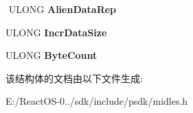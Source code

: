 \begin{DoxyCompactItemize}
$$\mbox{\label{struct___m_i_d_l___e_s___m_e_s_s_a_g_e_a3aa111c44fd601605aa2d4ae7d4327ff}} 
U\+L\+O\+NG {\bfseries Alien\+Data\+Rep}
\item 
\mbox{\label{struct___m_i_d_l___e_s___m_e_s_s_a_g_e_a15d4182df8fd4a4e8bf1bf74dc11bc67}} 
U\+L\+O\+NG {\bfseries Incr\+Data\+Size}
\item 
\mbox{\label{struct___m_i_d_l___e_s___m_e_s_s_a_g_e_a236808812d2046a5925b11a2464d597b}} 
U\+L\+O\+NG {\bfseries Byte\+Count}
\end{DoxyCompactItemize}


该结构体的文档由以下文件生成\+:\begin{DoxyCompactItemize}
\item 
E\+:/\+React\+O\+S-\/0../sdk/include/psdk/midles.\+h\end{DoxyCompactItemize}
